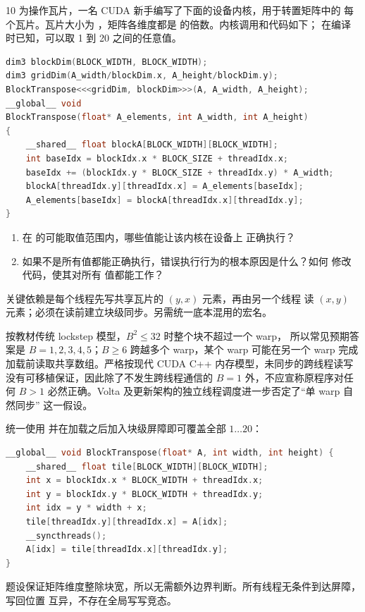 \begin{solutionexercise}{10}
\problemheading 为操作瓦片，一名 CUDA 新手编写了下面的设备内核，用于转置矩阵中的
每个瓦片。瓦片大小为 ，矩阵各维度都是
 的倍数。内核调用和代码如下； 在编译
时已知，可以取 1 到 20 之间的任意值。
\begin{lstlisting}[language=C++,firstnumber=1]
dim3 blockDim(BLOCK_WIDTH, BLOCK_WIDTH);
dim3 gridDim(A_width/blockDim.x, A_height/blockDim.y);
BlockTranspose<<<gridDim, blockDim>>>(A, A_width, A_height);
__global__ void
BlockTranspose(float* A_elements, int A_width, int A_height)
{
    __shared__ float blockA[BLOCK_WIDTH][BLOCK_WIDTH];
    int baseIdx = blockIdx.x * BLOCK_SIZE + threadIdx.x;
    baseIdx += (blockIdx.y * BLOCK_SIZE + threadIdx.y) * A_width;
    blockA[threadIdx.y][threadIdx.x] = A_elements[baseIdx];
    A_elements[baseIdx] = blockA[threadIdx.x][threadIdx.y];
}
\end{lstlisting}
\begin{enumerate}[label=\alph*.,leftmargin=2.2em]
  \item 在  的可能取值范围内，哪些值能让该内核在设备上
  正确执行？
  \item 如果不是所有值都能正确执行，错误执行行为的根本原因是什么？如何
  修改代码，使其对所有  值都能工作？
\end{enumerate}
\approachheading 关键依赖是每个线程先写共享瓦片的 $(y,x)$ 元素，再由另一个线程
读 $(x,y)$ 元素；必须在读前建立块级同步。另需统一底本混用的宏名。

\answerheading 按教材传统 lockstep 模型，$B^2\le32$ 时整个块不超过一个 warp，
所以常见预期答案是 $B=1,2,3,4,5$；$B\ge6$ 跨越多个 warp，某个 warp 可能在另一个
warp 完成加载前读取共享数组。严格按现代 CUDA C++ 内存模型，未同步的跨线程读写
没有可移植保证，因此除了不发生跨线程通信的 $B=1$ 外，不应宣称原程序对任何
$B>1$ 必然正确。Volta 及更新架构的独立线程调度进一步否定了“单 warp 自然同步”
这一假设。

统一使用  并在加载之后加入块级屏障即可覆盖全部 $1\ldots20$：
\begin{lstlisting}[language=C++]
__global__ void BlockTranspose(float* A, int width, int height) {
    __shared__ float tile[BLOCK_WIDTH][BLOCK_WIDTH];
    int x = blockIdx.x * BLOCK_WIDTH + threadIdx.x;
    int y = blockIdx.y * BLOCK_WIDTH + threadIdx.y;
    int idx = y * width + x;
    tile[threadIdx.y][threadIdx.x] = A[idx];
    __syncthreads();
    A[idx] = tile[threadIdx.x][threadIdx.y];
}
\end{lstlisting}
题设保证矩阵维度整除块宽，所以无需额外边界判断。所有线程无条件到达屏障，写回位置
互异，不存在全局写写竞态。


\end{solutionexercise}
